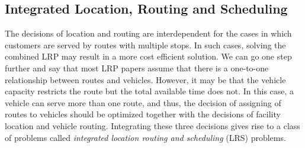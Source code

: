 



\subsection{Integrated Location, Routing and Scheduling}

The decisions of location and routing are interdependent for the cases in which customers are served
by routes with multiple stops. In such cases, solving the combined LRP may result in a more cost 
efficient solution. We can go one step further and say that most LRP papers assume that there is 
a one-to-one relationship between routes and vehicles.  
However, it may be that the vehicle capacity restricts the route but the total available 
time does not. In this case, a vehicle can serve more than one route, and thus, the decision 
of assigning of routes to vehicles should be optimized together with the decisions of facility 
location and vehicle routing. Integrating these three decisions gives rise to a class of problems 
called {\em integrated location routing and scheduling} (LRS) problems.  

